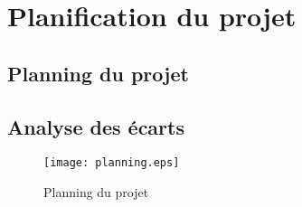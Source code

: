 \chapter{Planification du projet}

\section{Planning du projet}
\section{Analyse des \'ecarts}

\newpage
\begin{figure}[h]
\begin{minipage}[c]{0mm}
\texttt{[image: planning.eps]}
\end{minipage}
\caption{Planning du projet}
\label{fig:planning}
\end{figure}

